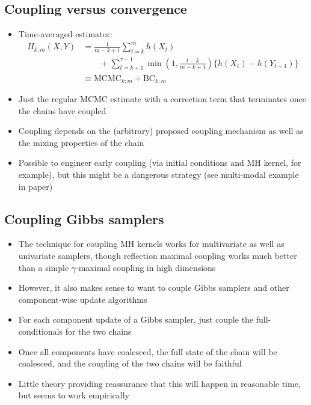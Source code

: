 \documentclass[11pt,a4paper]{article}
\begin{document}
\subsection{Coupling versus convergence}
\begin{itemize}
\item Time-averaged estimator:
\begin{align*}
H_{k:m}(X,Y) &= \frac{1}{m-k+1}\sum_{t=k}^m h(X_t)\\
&\mbox{}\qquad +\sum_{t=k+1}^{\tau-1}\min\left(1,\frac{t-k}{m-k+1}\right)\{h(X_t)-h(Y_{t-1})\}
\\
&\equiv \text{MCMC}_{k:m} + \text{BC}_{k:m}
\end{align*}
\item
  Just the regular MCMC estimate with a correction term that terminates once the chains have coupled
\item Coupling depends on the (arbitrary) proposed coupling mechanism as well as the mixing properties of the chain
\item Possible to engineer early coupling (via initial conditions and MH kernel, for example), but this might be a dangerous strategy (see multi-modal example in paper)
\end{itemize}



\subsection{Coupling Gibbs samplers}
\begin{itemize}
\item The technique for coupling MH kernels works for multivariate as well as univariate samplers, though reflection maximal coupling works much better than a simple $\gamma$-maximal coupling in high dimensions
\item However, it also makes sense to want to couple Gibbs samplers and other component-wise update algorithms
\item For each component update of a Gibbs sampler, just couple the full-conditionals for the two chains
\item Once all components have coalesced, the full state of the chain will be coalesced, and the coupling of the two chains will be faithful
  \item Little theory providing reassurance that this will happen in reasonable time, but seems to work empirically
\end{itemize}

  
\end{document}
